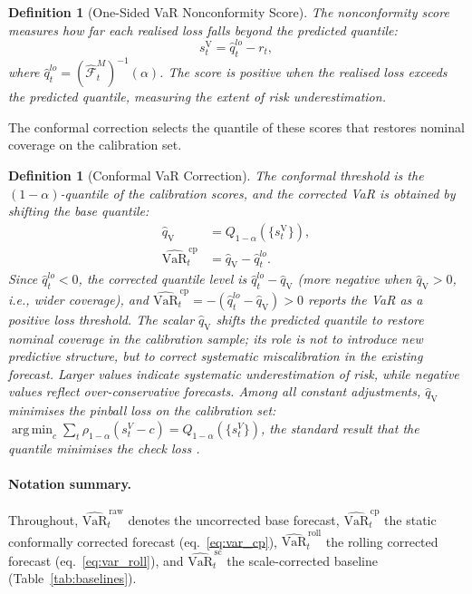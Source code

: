 \documentclass[preprint,11pt,authoryear]{elsarticle}
\DeclareMathOperator*{\argmin}{arg\,min}
\newtheorem{definition}[theorem]{Definition}
\newcommand{\VaR}{\mathrm{VaR}}
\newcommand{\1}{\boldsymbol{1}}
\newcommand{\qV}{\hat{q}_{\scriptscriptstyle\mathrm{V}}}
\newcommand{\Fhat}{\hat{\mathcal{F}}}
\begin{document}
	\begin{definition}[One-Sided VaR Nonconformity Score]
		\label{def:var_score}
		The nonconformity score measures how far each realised
		loss falls beyond the predicted quantile:
		\begin{equation}
			s_t^{\mathrm{V}} = \hat{q}_t^{lo} - r_t,
		\end{equation}
		where $\hat{q}_t^{lo} = (\Fhat_t^M)^{-1}(\alpha)$. The
		score is positive when the realised loss exceeds the
		predicted quantile, measuring the extent of risk
		underestimation.
	\end{definition}
	
	The conformal correction selects the quantile of these scores
	that restores nominal coverage on the calibration set.
	
	\begin{definition}[Conformal VaR Correction]
		\label{def:var_correction}
		The conformal threshold is the $(1-\alpha)$-quantile of
		the calibration scores, and the corrected VaR is obtained
		by shifting the base quantile:
		\begin{align}
			\qV &= Q_{1-\alpha}(\{s_t^{\mathrm{V}}\}), \\
			\widehat{\VaR}_t^{\,\mathrm{cp}}
			&= \qV - \hat{q}_t^{lo}. \label{eq:var_cp}
		\end{align}
		Since $\hat{q}_t^{lo} < 0$, the corrected quantile level is $\hat{q}_t^{lo} - \qV$ (more negative when $\qV > 0$, i.e., wider coverage), and $\widehat{\VaR}_t^{\,\mathrm{cp}} = -(\hat{q}_t^{lo} - \qV) > 0$ reports the VaR as a positive loss threshold.
		The scalar $\qV$ shifts the predicted quantile to restore
		nominal coverage in the calibration sample; its role is not to introduce new predictive structure, but to correct systematic miscalibration in the existing forecast. Larger values indicate systematic
		underestimation of risk, while negative values reflect
		over-conservative forecasts. Among all constant
		adjustments, $\qV$ minimises the pinball loss on the
		calibration set: $\argmin_c \sum_t
		\rho_{1-\alpha}(s_t^V - c) = Q_{1-\alpha}(\{s_t^V\})$,
		the standard result that the quantile minimises the check
		loss \citep[Theorem~1.1]{koenker2005quantile}.
	\end{definition}

	\paragraph{Notation summary.}
	Throughout, $\widehat{\VaR}^{\,\mathrm{raw}}_t$ denotes the uncorrected base forecast, $\widehat{\VaR}^{\,\mathrm{cp}}_t$ the static conformally corrected forecast (eq.~\ref{eq:var_cp}), $\widehat{\VaR}^{\,\mathrm{roll}}_t$ the rolling corrected forecast (eq.~\ref{eq:var_roll}), and $\widehat{\VaR}^{\,\mathrm{sc}}_t$ the scale-corrected baseline (Table~\ref{tab:baselines}).
\end{document}
